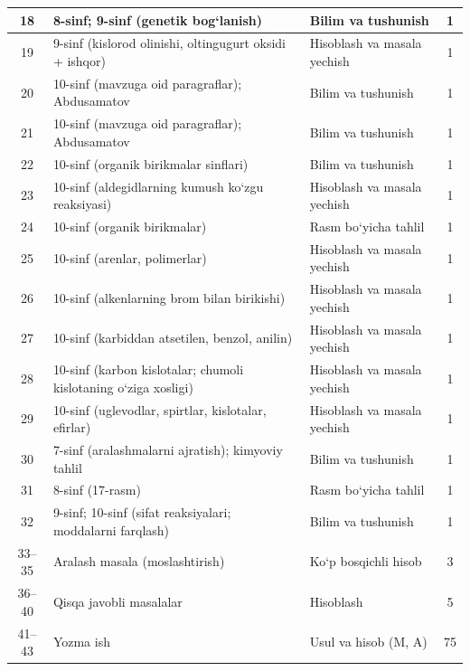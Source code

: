 \documentclass[11pt,a4paper]{article}
\begin{document}
{\begin{longtable}{|c|p{7.2cm}|p{5.4cm}|c|}
18 & 8-sinf; 9-sinf (genetik bog`lanish) & Bilim va tushunish & 1\\\hline
19 & 9-sinf (kislorod olinishi, oltingugurt oksidi + ishqor) & Hisoblash va masala yechish & 1\\\hline
20 & 10-sinf (mavzuga oid paragraflar); Abdusamatov & Bilim va tushunish & 1\\\hline
21 & 10-sinf (mavzuga oid paragraflar); Abdusamatov & Bilim va tushunish & 1\\\hline
22 & 10-sinf (organik birikmalar sinflari) & Bilim va tushunish & 1\\\hline
23 & 10-sinf (aldegidlarning kumush ko`zgu reaksiyasi) & Hisoblash va masala yechish & 1\\\hline
24 & 10-sinf (organik birikmalar) & Rasm bo`yicha tahlil & 1\\\hline
25 & 10-sinf (arenlar, polimerlar) & Hisoblash va masala yechish & 1\\\hline
26 & 10-sinf (alkenlarning brom bilan birikishi) & Hisoblash va masala yechish & 1\\\hline
27 & 10-sinf (karbiddan atsetilen, benzol, anilin) & Hisoblash va masala yechish & 1\\\hline
28 & 10-sinf (karbon kislotalar; chumoli kislotaning o`ziga xosligi) & Hisoblash va masala yechish & 1\\\hline
29 & 10-sinf (uglevodlar, spirtlar, kislotalar, efirlar) & Hisoblash va masala yechish & 1\\\hline
30 & 7-sinf (aralashmalarni ajratish); kimyoviy tahlil & Bilim va tushunish & 1\\\hline
31 & 8-sinf (17-rasm) & Rasm bo`yicha tahlil & 1\\\hline
32 & 9-sinf; 10-sinf (sifat reaksiyalari; moddalarni farqlash) & Bilim va tushunish & 1\\\hline
33--35 & Aralash masala (moslashtirish) & Ko`p bosqichli hisob & 3\\\hline
36--40 & Qisqa javobli masalalar & Hisoblash & 5\\\hline
41--43 & Yozma ish & Usul va hisob (M, A) & 75\\\hline
\end{longtable}}
\end{document}
